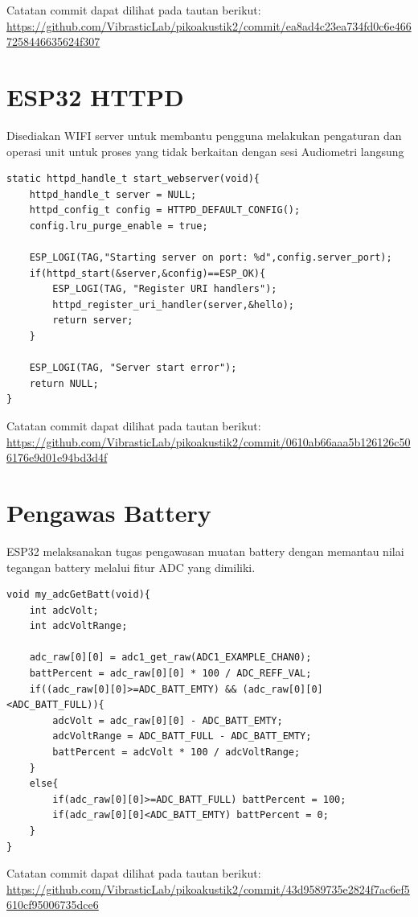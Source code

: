 \documentclass{book} %
\begin{document}
	Catatan commit dapat dilihat pada tautan berikut: \\
	\url{https://github.com/VibrasticLab/pikoakustik2/commit/ea8ad4c23ea734fd0c6e4667258446635624f307}
	
	\section{ESP32 HTTPD}
	
	Disediakan WIFI server untuk membantu pengguna melakukan pengaturan dan operasi unit untuk
	proses yang tidak berkaitan dengan sesi Audiometri langsung
	
	\begin{verbatim}
static httpd_handle_t start_webserver(void){
	httpd_handle_t server = NULL;
	httpd_config_t config = HTTPD_DEFAULT_CONFIG();
	config.lru_purge_enable = true;
	
	ESP_LOGI(TAG,"Starting server on port: %d",config.server_port);
	if(httpd_start(&server,&config)==ESP_OK){
		ESP_LOGI(TAG, "Register URI handlers");
		httpd_register_uri_handler(server,&hello);
		return server;
	}
	
	ESP_LOGI(TAG, "Server start error");
	return NULL;
}
	\end{verbatim}

	Catatan commit dapat dilihat pada tautan berikut: \\
	\url{https://github.com/VibrasticLab/pikoakustik2/commit/0610ab66aaa5b126126c506176e9d01e94bd3d4f}

	\section{Pengawas Battery}
	
	ESP32 melaksanakan tugas pengawasan muatan battery dengan memantau nilai tegangan battery melalui fitur ADC
	yang dimiliki.
	
	\begin{verbatim}
void my_adcGetBatt(void){
	int adcVolt;
	int adcVoltRange;
	
	adc_raw[0][0] = adc1_get_raw(ADC1_EXAMPLE_CHAN0);
	battPercent = adc_raw[0][0] * 100 / ADC_REFF_VAL;
	if((adc_raw[0][0]>=ADC_BATT_EMTY) && (adc_raw[0][0]<ADC_BATT_FULL)){
		adcVolt = adc_raw[0][0] - ADC_BATT_EMTY;
		adcVoltRange = ADC_BATT_FULL - ADC_BATT_EMTY;
		battPercent = adcVolt * 100 / adcVoltRange;
	}
	else{
		if(adc_raw[0][0]>=ADC_BATT_FULL) battPercent = 100;
		if(adc_raw[0][0]<ADC_BATT_EMTY) battPercent = 0;
	}
}
	\end{verbatim}

	Catatan commit dapat dilihat pada tautan berikut: \\
	\url{https://github.com/VibrasticLab/pikoakustik2/commit/43d9589735e2824f7ac6ef5610cf95006735dce6}
\end{document}
